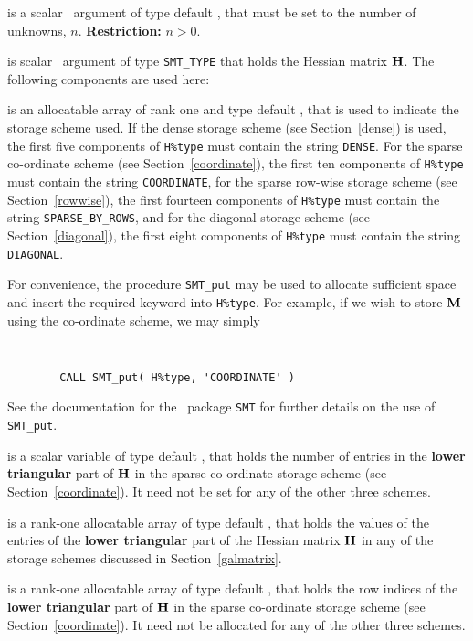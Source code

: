 \documentclass{galahad}
\begin{document}
\begin{description}

 is a scalar \intentin\ argument of type default \integer, that must be
set to the number of unknowns, $n$. {\bf Restriction: } $n  >  0$.

 is scalar \intentin\ argument of type {\tt SMT\_TYPE}
that holds the Hessian matrix ${\mathbf{H}}$. The following components
are used here:

\begin{description}

 is an allocatable array of rank one and type default
\character, that
is used to indicate the storage scheme used. If the dense storage scheme
(see Section~\ref{dense}) is used,
the first five components of {\tt H\%type} must contain the
string {\tt DENSE}.
For the sparse co-ordinate scheme (see Section~\ref{coordinate}),
the first ten components of {\tt H\%type} must contain the
string {\tt COORDINATE},
for the sparse row-wise storage scheme (see Section~\ref{rowwise}),
the first fourteen components of {\tt H\%type} must contain the
string {\tt SPARSE\_BY\_ROWS},
and for the diagonal storage scheme (see Section~\ref{diagonal}),
the first eight components of {\tt H\%type} must contain the
string {\tt DIAGONAL}.

For convenience, the procedure {\tt SMT\_put}
may be used to allocate sufficient space and insert the required keyword
into {\tt H\%type}.
For example, if we wish to store ${\mathbf{M}}$ using the co-ordinate scheme,
we may simply
{\tt
\begin{verbatim}
        CALL SMT_put( H%type, 'COORDINATE' )
\end{verbatim}
}
\noindent
See the documentation for the \galahad\ package {\tt SMT}
for further details on the use of {\tt SMT\_put}.

 is a scalar variable of type default \integer, that
holds the number of entries in the {\bf lower triangular} part of ${\mathbf{H}}$
in the sparse co-ordinate storage scheme (see Section~\ref{coordinate}).
It need not be set for any of the other three schemes.

 is a rank-one allocatable array of type default \realdp, that holds
the values of the entries of the {\bf lower triangular} part
of the Hessian matrix ${\mathbf{H}}$ in any of the
storage schemes discussed in Section~\ref{galmatrix}.

 is a rank-one allocatable array of type default \integer,
that holds the row indices of the {\bf lower triangular} part of ${\mathbf{H}}$
in the sparse co-ordinate storage
scheme (see Section~\ref{coordinate}).
It need not be allocated for any of the other three schemes.


\end{description}
\end{description}
\end{document}

